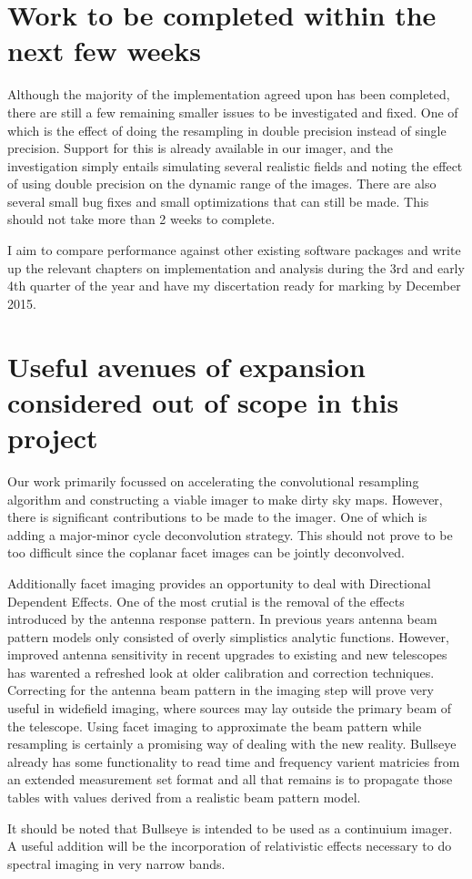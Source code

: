 \documentclass[a4paper,10pt]{article}
\begin{document}
\section{Work to be completed within the next few weeks}
Although the majority of the implementation agreed upon has been completed, there are still a few remaining smaller issues to be investigated and fixed. One of which is
the effect of doing the resampling in double precision instead of single precision. Support for this is already available in our imager, and the investigation simply entails
simulating several realistic fields and noting the effect of using double precision on the dynamic range of the images. There are also several small bug fixes and small 
optimizations that can still be made. This should not take more than 2 weeks to complete.

I aim to compare performance against other existing software packages and write up the relevant chapters on implementation and analysis during the 3rd and early 4th quarter
of the year and have my discertation ready for marking by December 2015. 
\section{Useful avenues of expansion considered out of scope in this project}
Our work primarily focussed on accelerating the convolutional resampling algorithm and constructing a viable imager to make dirty sky maps. However, there is significant
contributions to be made to the imager. One of which is adding a major-minor cycle deconvolution strategy. This should not prove to be too difficult since
the coplanar facet images can be jointly deconvolved.

Additionally facet imaging provides an opportunity to deal with Directional Dependent Effects. One of the most crutial is the removal of the effects introduced by the antenna
response pattern. In previous years antenna beam pattern models only consisted of overly simplistics analytic functions. However, improved antenna sensitivity in recent upgrades to
existing and new telescopes has warented a refreshed look at older calibration and correction techniques. Correcting for the antenna beam pattern in the imaging step will prove very
useful in widefield imaging, where sources may lay outside the primary beam of the telescope. Using facet imaging to approximate the beam pattern while resampling is certainly a promising
way of dealing with the new reality. Bullseye already has some functionality to read time and frequency varient matricies from an extended measurement set format and all that remains is to
propagate those tables with values derived from a realistic beam pattern model.

It should be noted that Bullseye is intended to be used as a continuium imager. A useful addition will be the incorporation of 
relativistic effects necessary to do spectral imaging in very narrow bands.
\pagebreak
{}

\end{document}
